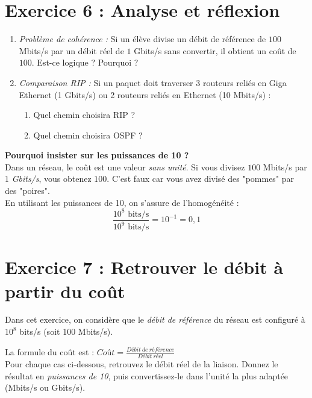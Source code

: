 \section*{Exercice 6 : Analyse et réflexion}
\begin{enumerate}
\item \textit{Problème de cohérence :} Si un élève divise un débit de référence de $100$ Mbits/s par un débit réel de $1$ Gbits/s sans convertir, il obtient un coût de $100$. Est-ce logique ? Pourquoi ?
\item \textit{Comparaison RIP :} Si un paquet doit traverser 3 routeurs reliés en Giga Ethernet (1 Gbits/s) ou 2 routeurs reliés en Ethernet (10 Mbits/s) :
    \begin{enumerate}
        \item Quel chemin choisira RIP ?
        \item Quel chemin choisira OSPF ?
    \end{enumerate}
    
\end{enumerate}



\begin{Comprendre}
\textbf{Pourquoi insister sur les puissances de 10 ?}\\
Dans un réseau, le coût est une valeur \textit{sans unité}. 
Si vous divisez $100$ Mbits/s par $1$ \textit{Gbits/s}, vous obtenez $100$. C'est faux car vous avez divisé des "pommes" par des "poires". \\
En utilisant les puissances de 10, on s'assure de l'homogénéité : 
$$\frac{10^8 \text{ bits/s}}{10^9 \text{ bits/s}} = 10^{-1} = 0,1$$
\end{Comprendre}


\section*{Exercice 7 : Retrouver le débit à partir du coût}

Dans cet exercice, on considère que le \textit{débit de référence} du réseau est configuré à $10^8$ bits/s (soit 100 Mbits/s).

La formule du coût est : $Coût = \frac{Débit\ de\ référence}{Débit\ réel}$\\

Pour chaque cas ci-dessous, retrouvez le débit réel de la liaison. Donnez le résultat en \textit{puissances de 10}, puis convertissez-le dans l'unité la plus adaptée (Mbits/s ou Gbits/s).

